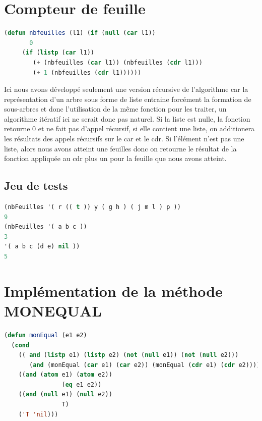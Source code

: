 \documentclass[a4paper,10pt]{report}
\begin{document}
	\section{Compteur de feuille}
	
	   \begin{lstlisting}[language=Lisp]
(defun nbfeuilles (l1) (if (null (car l1))
	   0
	 (if (listp (car l1)) 
	    (+ (nbfeuilles (car l1)) (nbfeuilles (cdr l1))) 
	    (+ 1 (nbfeuilles (cdr l1))))))
	  \end{lstlisting}

	Ici nous avons développé seulement une version récursive de l'algorithme car la représentation d'un arbre sous forme de liste entraine forcément la formation de sous-arbres et donc l'utilisation
	de la même fonction pour les traiter, un algorithme itératif ici ne serait donc pas naturel. Si la liste est nulle, la fonction retourne 0 et ne fait pas d'appel récursif,
	si elle contient une liste, on additionera les résultats des appels récursifs sur le car et le cdr. Si l'élément n'est pas une liste, alors nous avons atteint une feuilles
	donc on retourne le résultat de la fonction appliquée au cdr plus un pour la feuille que nous avons atteint.
	  \subsection{Jeu de tests}
	\begin{lstlisting}[language=Lisp]
(nbFeuilles '( r (( t )) y ( g h ) ( j m l ) p ))
9
(nbFeuilles '( a b c ))
3
'( a b c (d e) nil ))
5
	\end{lstlisting}\newpage
	\section{Implémentation de la méthode MONEQUAL}
	  \begin{lstlisting}[language=Lisp]
(defun monEqual (e1 e2)
  (cond 
    (( and (listp e1) (listp e2) (not (null e1)) (not (null e2)))
       (and (monEqual (car e1) (car e2)) (monEqual (cdr e1) (cdr e2))))
    ((and (atom e1) (atom e2))
                (eq e1 e2))
    ((and (null e1) (null e2))
                T)
    ('T 'nil)))
	  \end{lstlisting}
\end{document}
